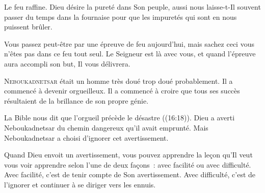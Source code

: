 
Le feu raffine. Dieu désire la pureté dans Son peuple,
 aussi nous laisse-t-Il souvent passer du temps dans la fournaise
 pour que les impuretés qui sont en nous puissent brûler. 

Vous passez peut-être par une épreuve de feu aujourd'hui, mais sachez ceci
 \ocadr vous n'êtes pas dans ce feu tout seul.
 Le Seigneur est là avec vous, et quand l'épreuve aura accompli son but,
 Il vous délivrera. 

\dvrule






\lettrine{N}{eboukadnetsar} était un homme très doué
 \ocadr trop doué probablement. Il a commencé à devenir orgueilleux.
 Il a commencé à croire que tous ses succès résultaient de la brillance
 de son propre génie. 

La Bible nous dit que \Og l'orgueil précède le désastre \Fg{}
 ((16:18)).
 Dieu a averti Neboukadnetsar du chemin dangereux qu'il avait emprunté.
 Mais Neboukadnetsar a choisi d'ignorer cet avertissement. 


Quand Dieu envoit un avertissement, vous pouvez apprendre la le\c{c}on
 qu'Il veut vous voir apprendre selon l'une de deux fa\c{c}ons~:
 avec facilité ou avec difficulté. Avec facilité,
 c'est de tenir compte de Son avertissement. Avec difficulté,
 c'est de l'ignorer et continuer à se diriger vers les ennuis. 

